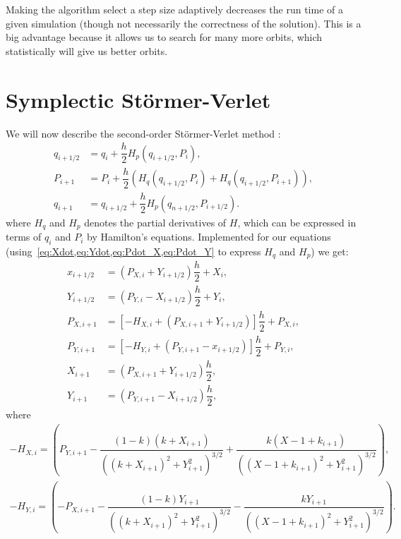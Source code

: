 Making the algorithm select a step size adaptively decreases the run time of a given simulation (though not necessarily the correctness of the solution). This is a big advantage because it allows us to search for many more orbits, which statistically will give us better orbits.

\section{Symplectic Störmer-Verlet}
We will now describe the second-order Störmer-Verlet method \cite{Hochbruck2008}:
\begin{align}
q_{i+1/2} &= q_i + \dfrac{h}{2}H_p(q_{i+1/2}, P_i), \\
P_{i+1} &= P_i + \dfrac{h}{2}(H_q(q_{i+1/2}, P_i) + H_q(q_{i+1/2}, P_{i+1})), \\
q_{i+1} &= q_{i+1/2} + \dfrac{h}{2}H_p(q_{n+1/2}, P_{i+1/2}).
\end{align}
where $H_q$ and $H_p$ denotes the partial derivatives of $H$, which can be expressed in terms of $q_i$ and $P_i$ by Hamilton's equations. Implemented for our equations (using~\cref{eq:Xdot,eq:Ydot,eq:Pdot_X,eq:Pdot_Y} to express $H_q$ and $H_p$) we get:
\begin{align}
x_{i+1/2} &= (P_{X,i} + Y_{i+1/2})\dfrac{h}{2} + X_i, \\[0.3cm]
Y_{i+1/2} &= (P_{Y,i} - X_{i+1/2})\dfrac{h}{2} + Y_i, \\[0.8cm]
%
%
P_{X,i+1} &= \left[-H_{X,i} + (P_{X,i+1} + Y_{i+1/2}) \right]\dfrac{h}{2} + P_{X,i}, \\[0.3cm]
%
P_{Y,i+1} &= \left[-H_{Y,i} + (P_{Y,i+1} -x_{i+1/2}) \right]\dfrac{h}{2} + P_{Y,i},\\[0.8cm]
%
%
X_{i+1} &= (P_{X,i+1} + Y_{i+1/2})\dfrac{h}{2}, \\[0.3cm]
Y_{i+1} &= (P_{Y,i+1} - X_{i+1/2})\dfrac{h}{2},
\end{align}
where
\begin{align}
-H_{X,i} = \left(P_{Y,i+1} - \dfrac{(1-k)(k+X_{i+1})}{((k+X_{i+1})^2+Y_{i+1}^2)^{3/2}} + \dfrac{k(X-1+k_{i+1})}{((X-1+k_{i+1})^2+Y_{i+1}^2)^{3/2}}\right), \\[0.5cm]
-H_{Y,i} = \left(-P_{X,i+1} - \dfrac{(1-k)Y_{i+1}}{((k+X_{i+1})^2+Y_{i+1}^2)^{3/2}} - \dfrac{k Y_{i+1}}{((X-1+k_{i+1})^2+Y_{i+1}^2)^{3/2}}\right).
\end{align}


